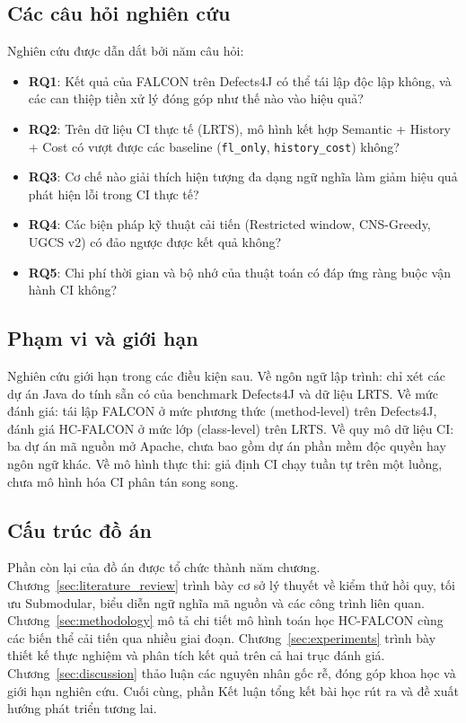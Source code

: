 \subsection{Các câu hỏi nghiên cứu}
\label{subsec:rqs}

Nghiên cứu được dẫn dắt bởi năm câu hỏi:

\begin{itemize}
    \item \textbf{RQ1}: Kết quả của FALCON trên Defects4J có thể tái lập độc lập không, và các can thiệp tiền xử lý đóng góp như thế nào vào hiệu quả?
    \item \textbf{RQ2}: Trên dữ liệu CI thực tế (LRTS), mô hình kết hợp Semantic + History + Cost có vượt được các baseline (\texttt{fl\_only}, \texttt{history\_cost}) không?
    \item \textbf{RQ3}: Cơ chế nào giải thích hiện tượng đa dạng ngữ nghĩa làm giảm hiệu quả phát hiện lỗi trong CI thực tế?
    \item \textbf{RQ4}: Các biện pháp kỹ thuật cải tiến (Restricted window, CNS-Greedy, UGCS v2) có đảo ngược được kết quả không?
    \item \textbf{RQ5}: Chi phí thời gian và bộ nhớ của thuật toán có đáp ứng ràng buộc vận hành CI không?
\end{itemize}

\subsection{Phạm vi và giới hạn}
\label{subsec:scope}

Nghiên cứu giới hạn trong các điều kiện sau. Về ngôn ngữ lập trình: chỉ xét các dự án Java do tính sẵn có của benchmark Defects4J và dữ liệu LRTS. Về mức đánh giá: tái lập FALCON ở mức phương thức (method-level) trên Defects4J, đánh giá HC-FALCON ở mức lớp (class-level) trên LRTS. Về quy mô dữ liệu CI: ba dự án mã nguồn mở Apache, chưa bao gồm dự án phần mềm độc quyền hay ngôn ngữ khác. Về mô hình thực thi: giả định CI chạy tuần tự trên một luồng, chưa mô hình hóa CI phân tán song song.

\subsection{Cấu trúc đồ án}
\label{subsec:structure}

Phần còn lại của đồ án được tổ chức thành năm chương. Chương~\ref{sec:literature_review} trình bày cơ sở lý thuyết về kiểm thử hồi quy, tối ưu Submodular, biểu diễn ngữ nghĩa mã nguồn và các công trình liên quan. Chương~\ref{sec:methodology} mô tả chi tiết mô hình toán học HC-FALCON cùng các biến thể cải tiến qua nhiều giai đoạn. Chương~\ref{sec:experiments} trình bày thiết kế thực nghiệm và phân tích kết quả trên cả hai trục đánh giá. Chương~\ref{sec:discussion} thảo luận các nguyên nhân gốc rễ, đóng góp khoa học và giới hạn nghiên cứu. Cuối cùng, phần Kết luận tổng kết bài học rút ra và đề xuất hướng phát triển tương lai.